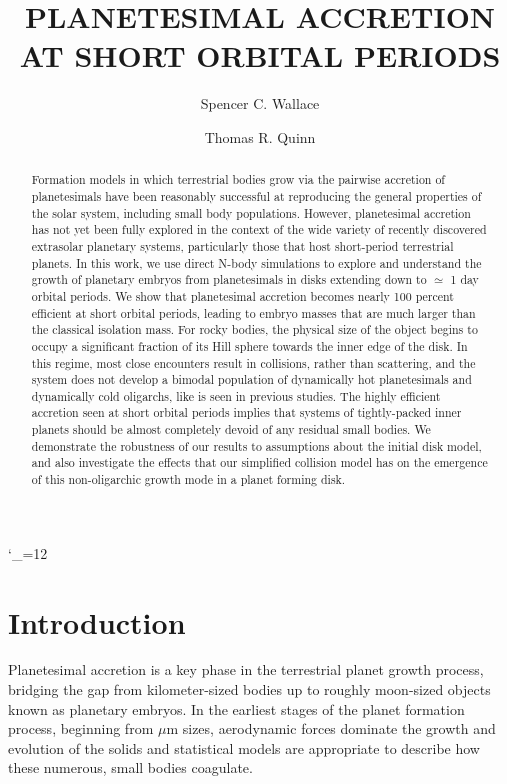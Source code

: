 \documentclass[twocolumn,linenumbers]{aastex63}
\def\upsubscripts{\catcode`\_=12 } \def\normalsubscripts{\catcode`\_=8 }
\begin{document}
\upsubscripts

\title{PLANETESIMAL ACCRETION AT SHORT ORBITAL PERIODS}

\author{Spencer C. Wallace}

\author{Thomas R. Quinn}

\begin{abstract}
Formation models in which terrestrial bodies grow via the pairwise accretion of planetesimals have been reasonably successful at reproducing the general properties of the solar system, including small body populations. However, planetesimal accretion has not yet been fully explored in the context of the wide variety of recently discovered extrasolar planetary systems, particularly those that host short-period terrestrial planets. In this work, we use direct N-body simulations to explore and understand the growth of planetary embryos from planetesimals in disks extending down to $\simeq$ 1 day orbital periods. We show that planetesimal accretion becomes nearly 100 percent efficient at short orbital periods, leading to embryo masses that are much larger than the classical isolation mass. For rocky bodies, the physical size of the object begins to occupy a significant fraction of its Hill sphere towards the inner edge of the disk. In this regime, most close encounters result in collisions, rather than scattering, and the system does not develop a bimodal population of dynamically hot planetesimals and dynamically cold oligarchs, like is seen in previous studies. The highly efficient accretion seen at short orbital periods implies that systems of tightly-packed inner planets should be almost completely devoid of any residual small bodies. We demonstrate the robustness of our results to assumptions about the initial disk model, and also investigate the effects that our simplified collision model has on the emergence of this non-oligarchic growth mode in a planet forming disk.
\end{abstract}

\section{Introduction} \label{sec:intro}

Planetesimal accretion is a key phase in the terrestrial planet growth
process, bridging the gap from kilometer-sized bodies up to roughly
moon-sized objects known as planetary embryos. In the earliest stages
of the planet formation process, beginning from $\mu$m sizes, aerodynamic forces dominate the
growth and evolution of the solids and statistical models
\citep{johansen14, birnstiel16} are appropriate to describe how these
numerous, small bodies coagulate. 
\end{document}
